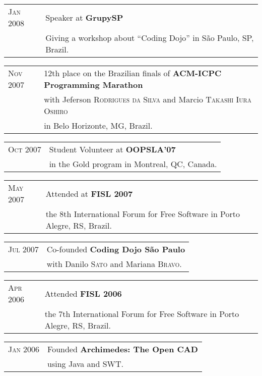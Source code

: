 \documentclass[letter,10pt]{article}
\begin{document}
\begin{tabular}{p{2.5cm}l}
  \textsc{Jan 2008} & Speaker at \textbf{GrupySP}\\
  &Giving a workshop about ``Coding Dojo'' in São Paulo, SP, Brazil.\\
\end{tabular}

\begin{tabular}{p{2.5cm}l}
  \textsc{Nov 2007} & 12th place on the Brazilian finals of \textbf{ACM-ICPC
    Programming Marathon}\\
  & with Jeferson \textsc{Rodrigues da Silva} and Marcio
  \textsc{Takashi Iura Oshiro}\\
  & in Belo Horizonte, MG, Brazil.\\
\end{tabular}

\begin{tabular}{p{2.5cm}l}
  \textsc{Oct 2007} & Student Volunteer at \textbf{OOPSLA'07}\\
  & in the Gold program in Montreal, QC, Canada.\\
\end{tabular}

\begin{tabular}{p{2.5cm}l}
  \textsc{May 2007} & Attended at \textbf{FISL 2007}\\
  & the 8th International Forum for Free Software in Porto
  Alegre, RS, Brazil.\\
\end{tabular}

\begin{tabular}{p{2.5cm}l}
  \textsc{Jul 2007} & Co-founded \textbf{Coding Dojo São Paulo}\\
  & with Danilo \textsc{Sato} and Mariana \textsc{Bravo}.\\
\end{tabular}

\begin{tabular}{p{2.5cm}l}
  \textsc{Apr 2006} & Attended \textbf{FISL 2006}\\
  & the 7th International Forum for Free Software in Porto
  Alegre, RS, Brazil.\\
\end{tabular}

\begin{tabular}{p{2.5cm}l}
  \textsc{Jan 2006} & Founded \textbf{Archimedes: The Open CAD}\\
  & using Java and SWT.\\
\end{tabular}
\end{document}
